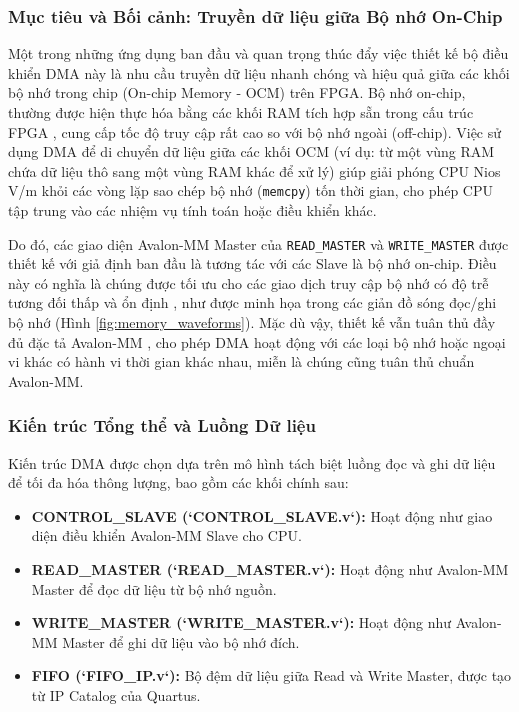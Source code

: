 \subsubsection{Mục tiêu và Bối cảnh: Truyền dữ liệu giữa Bộ nhớ On-Chip}
\label{subsec:dma_context_onchip}
Một trong những ứng dụng ban đầu và quan trọng thúc đẩy việc thiết kế bộ điều khiển DMA này là nhu cầu truyền dữ liệu nhanh chóng và hiệu quả giữa các khối bộ nhớ trong chip (On-chip Memory - OCM) trên FPGA. Bộ nhớ on-chip, thường được hiện thực hóa bằng các khối RAM tích hợp sẵn trong cấu trúc FPGA \cite{memory_byteenable}, cung cấp tốc độ truy cập rất cao so với bộ nhớ ngoài (off-chip). Việc sử dụng DMA để di chuyển dữ liệu giữa các khối OCM (ví dụ: từ một vùng RAM chứa dữ liệu thô sang một vùng RAM khác để xử lý) giúp giải phóng CPU Nios V/m khỏi các vòng lặp sao chép bộ nhớ (\texttt{memcpy}) tốn thời gian, cho phép CPU tập trung vào các nhiệm vụ tính toán hoặc điều khiển khác.

Do đó, các giao diện Avalon-MM Master của \texttt{READ\_MASTER} và \texttt{WRITE\_MASTER} được thiết kế với giả định ban đầu là tương tác với các Slave là bộ nhớ on-chip. Điều này có nghĩa là chúng được tối ưu cho các giao dịch truy cập bộ nhớ có độ trễ tương đối thấp và ổn định \cite{memory_byteenable}, như được minh họa trong các giản đồ sóng đọc/ghi bộ nhớ (Hình \ref{fig:memory_waveforms}). Mặc dù vậy, thiết kế vẫn tuân thủ đầy đủ đặc tả Avalon-MM \cite{avalon_mm_transfer}, cho phép DMA hoạt động với các loại bộ nhớ hoặc ngoại vi khác có hành vi thời gian khác nhau, miễn là chúng cũng tuân thủ chuẩn Avalon-MM.

\subsubsection{Kiến trúc Tổng thể và Luồng Dữ liệu}
Kiến trúc DMA được chọn dựa trên mô hình tách biệt luồng đọc và ghi dữ liệu để tối đa hóa thông lượng, bao gồm các khối chính sau:
\begin{itemize}
    \item \textbf{CONTROL\_SLAVE (`CONTROL\_SLAVE.v`):} Hoạt động như giao diện điều khiển Avalon-MM Slave cho CPU.
    \item \textbf{READ\_MASTER (`READ\_MASTER.v`):} Hoạt động như Avalon-MM Master để đọc dữ liệu từ bộ nhớ nguồn.
    \item \textbf{WRITE\_MASTER (`WRITE\_MASTER.v`):} Hoạt động như Avalon-MM Master để ghi dữ liệu vào bộ nhớ đích.
    \item \textbf{FIFO (`FIFO\_IP.v`):} Bộ đệm dữ liệu giữa Read và Write Master, được tạo từ IP Catalog của Quartus.
\end{itemize}


